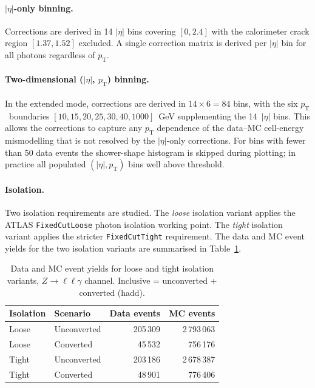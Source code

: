 \documentclass[11pt,a4paper]{article}
\newcommand{\abseta}{\ensuremath{|\eta|}}
\newcommand{\pt}{\ensuremath{p_{\mathrm{T}}}}
\begin{document}
\paragraph{$\abseta$-only binning.}
Corrections are derived in 14 $\abseta$ bins covering $[0, 2.4]$ with
the calorimeter crack region $[1.37, 1.52]$ excluded.  A single correction
matrix is derived per $\abseta$ bin for all photons regardless of $\pt$.

\paragraph{Two-dimensional ($\abseta$, $\pt$) binning.}
In the extended mode, corrections are derived in $14 \times 6 = 84$
bins, with the six \pt\ boundaries $[10, 15, 20, 25, 30, 40, 1000]$~GeV
supplementing the 14~$\abseta$ bins.  This allows the corrections to
capture any $\pt$ dependence of the data--MC cell-energy mismodelling
that is not resolved by the $\abseta$-only corrections.  For bins with
fewer than 50 data events the shower-shape histogram is skipped during
plotting; in practice all populated $(\abseta, \pt)$ bins well above
threshold.

\paragraph{Isolation.}
Two isolation requirements are studied.  The \emph{loose} isolation variant
applies the ATLAS \texttt{FixedCutLoose} photon isolation working point.
The \emph{tight} isolation variant applies the stricter
\texttt{FixedCutTight} requirement.  The data and MC event yields for the
two isolation variants are summarised in Table~\ref{tab:iso-yields}.

\begin{table}[htbp]
\centering
\caption{Data and MC event yields for loose and tight isolation variants,
  $Z \to \ell\ell\gamma$ channel.  Inclusive = unconverted + converted
  (hadd).}
\label{tab:iso-yields}
\begin{tabular}{llrr}
\toprule
Isolation & Scenario    & Data events & MC events \\
\midrule
Loose     & Unconverted & 205\,309    & 2\,793\,063 \\
Loose     & Converted   & 45\,532     & 756\,176    \\
\midrule
Tight     & Unconverted & 203\,186    & 2\,678\,387 \\
Tight     & Converted   & 48\,901     & 776\,406    \\
\bottomrule
\end{tabular}
\end{table}
\end{document}
